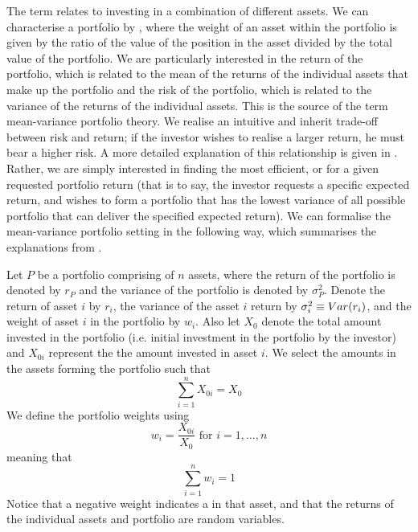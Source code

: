 The term  relates to investing in a combination of different assets.
We can characterise a portfolio by , where the weight of an asset within the portfolio is given by the ratio of the value of the position in the asset divided by the total value of the portfolio.
We are particularly interested in the return of the portfolio, which is related to the mean of the returns of the individual assets that make up the portfolio and the risk of the portfolio, which is related to the variance of the returns of the individual assets.
This is the source of the term mean-variance portfolio theory.
We realise an intuitive and inherit trade-off between risk and return; if the investor wishes to realise a larger return, he must bear a higher risk.
A more detailed explanation of this relationship is given in \cite{Lue98,Kuh12e}.
Rather, we are simply interested in finding the most efficient, or  for a given requested portfolio return (that is to say, the investor requests a specific expected return, and wishes to form a portfolio that has the lowest variance of all possible portfolio that can deliver the specified expected return).
We can formalise the mean-variance portfolio setting in the following way, which summarises the explanations from \cite{Onn02,Lue98,Kuh12e}.

Let $P$ be a portfolio comprising of $n$ assets, where the return of the portfolio is denoted by $r_{P}$ and the variance of the portfolio is denoted by $\sigma^{2}_{P}$.
Denote the return of asset $i$ by $r_{i}$, the variance of the asset $i$ return by $\sigma^{2}_{i} \equiv Var(r_{i})$, and the weight of asset $i$ in the portfolio by $w_{i}$.
Also let $X_{0}$ denote the total amount invested in the portfolio (i.e. initial investment in the portfolio by the investor) and $X_{0i}$ represent the the amount invested in asset $i$.
We select the amounts in the assets forming the portfolio such that
\begin{equation}
	\label{eq:portfolioAmounts}
	\sum_{i=1}^{n} X_{0i} = X_{0}
\end{equation}
We define the portfolio weights using
\begin{equation}
	\label{eq:portfolioWeights}
	w_{i} = \frac{X_{0i}}{X_{0}} \text{ for } i = 1,\dots,n
\end{equation}
meaning that
\begin{equation}
	\label{eq:portfolioWeightsSum}
	\sum_{i=1}^{n} w_{i} = 1
\end{equation}
Notice that a negative weight indicates a  in that asset, and that the returns of the individual assets and portfolio are random variables.

